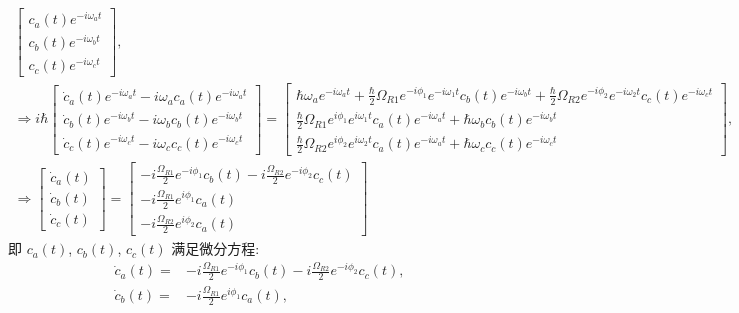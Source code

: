 \documentclass{assignment}
\begin{document}
\begin{sol}
\begin{itemize}
{\begin{gather}
\begin{bmatrix}
                c_a(t)e^{-i\omega_at}\\
                c_b(t)e^{-i\omega_bt}\\
                c_c(t)e^{-i\omega_ct}
            \end{bmatrix},\\
            \Longrightarrow i\hbar\begin{bmatrix}
                \dot{c}_a(t)e^{-i\omega_at}-i\omega_ac_a(t)e^{-i\omega_at}\\
                \dot{c}_b(t)e^{-i\omega_bt}-i\omega_bc_b(t)e^{-i\omega_bt}\\
                \dot{c}_c(t)e^{-i\omega_ct}-i\omega_cc_c(t)e^{-i\omega_ct}
            \end{bmatrix}=\begin{bmatrix}
                \hbar\omega_ae^{-i\omega_at}+\frac{\hbar}{2}\Omega_{R1}e^{-i\phi_1}e^{-i\omega_1t}c_b(t)e^{-i\omega_bt}+\frac{\hbar}{2}\Omega_{R2}e^{-i\phi_2}e^{-i\omega_2t}c_c(t)e^{-i\omega_ct}\\
                \frac{\hbar}{2}\Omega_{R1}e^{i\phi_1}e^{i\omega_1t}c_a(t)e^{-i\omega_at}+\hbar\omega_bc_b(t)e^{-i\omega_bt}\\
                \frac{\hbar}{2}\Omega_{R2}e^{i\phi_2}e^{i\omega_2t}c_a(t)e^{-i\omega_at}+\hbar\omega_cc_c(t)e^{-i\omega_ct}
            \end{bmatrix},\\
            \Longrightarrow\begin{bmatrix}
                \dot{c}_a(t)\\
                \dot{c}_b(t)\\
                \dot{c}_c(t)
            \end{bmatrix}=\begin{bmatrix}
                -i\frac{\Omega_{R1}}{2}e^{-i\phi_1}c_b(t)-i\frac{\Omega_{R2}}{2}e^{-i\phi_2}c_c(t)\\
                -i\frac{\Omega_{R1}}{2}e^{i\phi_1}c_a(t)\\
                -i\frac{\Omega_{R2}}{2}e^{i\phi_2}c_a(t)
            \end{bmatrix}
        \end{gather}
        }
        即 $c_a(t)$, $c_b(t)$, $c_c(t)$ 满足微分方程:
        \begin{align}
            \dot{c}_a(t)=&-i\frac{\Omega_{R1}}{2}e^{-i\phi_1}c_b(t)-i\frac{\Omega_{R2}}{2}e^{-i\phi_2}c_c(t),\\
            \dot{c}_b(t)=&-i\frac{\Omega_{R1}}{2}e^{i\phi_1}c_a(t),\\

\end{align}
\end{itemize}
\end{sol}
\end{document}
